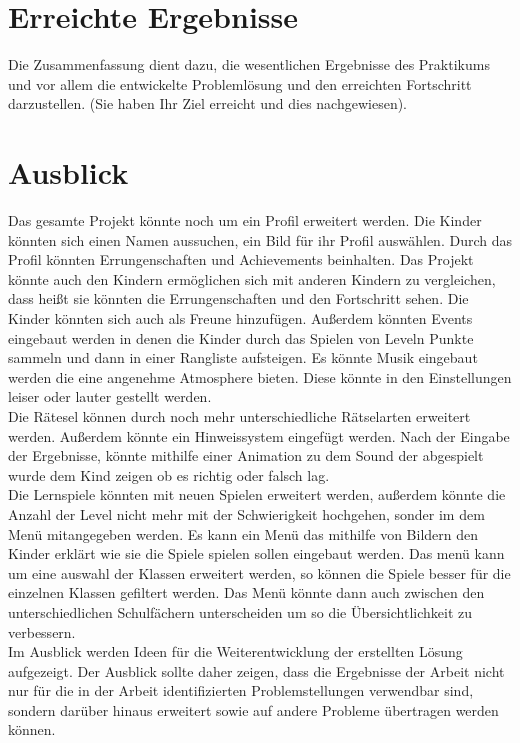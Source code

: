 \section{Erreichte Ergebnisse}
\label{sec:ergebnisse}

Die Zusammenfassung dient dazu, die wesentlichen Ergebnisse des 
Praktikums und vor allem die entwickelte Problemlösung und den 
erreichten Fortschritt darzustellen. (Sie haben Ihr Ziel erreicht und 
dies nachgewiesen).

\section{Ausblick}
\label{sec:ausblick}


Das gesamte Projekt könnte noch um ein Profil erweitert werden. Die Kinder könnten sich einen Namen aussuchen, ein Bild für ihr Profil auswählen. Durch das Profil könnten Errungenschaften   und Achievements beinhalten. Das Projekt könnte auch den Kindern ermöglichen sich mit anderen Kindern zu vergleichen, dass heißt sie könnten die Errungenschaften und den Fortschritt sehen. Die Kinder könnten sich auch als Freune hinzufügen. Außerdem könnten Events eingebaut werden in denen die Kinder durch das Spielen von Leveln Punkte sammeln und dann in einer Rangliste aufsteigen. Es könnte Musik eingebaut werden die eine angenehme Atmosphere bieten. Diese könnte in den Einstellungen leiser oder lauter gestellt werden. \\
Die Rätesel können durch noch mehr unterschiedliche Rätselarten erweitert werden. Außerdem könnte ein Hinweissystem eingefügt werden. Nach der Eingabe der Ergebnisse, könnte mithilfe einer Animation zu dem Sound der abgespielt wurde dem Kind zeigen ob es richtig oder falsch lag.\\
Die Lernspiele könnten mit neuen Spielen erweitert werden, außerdem könnte die Anzahl der Level nicht mehr mit der Schwierigkeit hochgehen, sonder im dem Menü mitangegeben werden. Es kann ein Menü das mithilfe von Bildern den Kinder erklärt wie sie die Spiele spielen sollen eingebaut werden. Das menü kann um eine auswahl der Klassen erweitert werden, so können die Spiele besser für die einzelnen Klassen gefiltert werden. Das Menü könnte dann auch zwischen den unterschiedlichen Schulfächern unterscheiden um so die Übersichtlichkeit zu verbessern.\\


Im Ausblick werden Ideen für die Weiterentwicklung der erstellten Lösung 
aufgezeigt. Der Ausblick sollte daher zeigen, dass die Ergebnisse der 
Arbeit nicht nur für die in der Arbeit identifizierten Problemstellungen 
verwendbar sind, sondern darüber hinaus erweitert sowie auf andere 
Probleme übertragen werden können.

